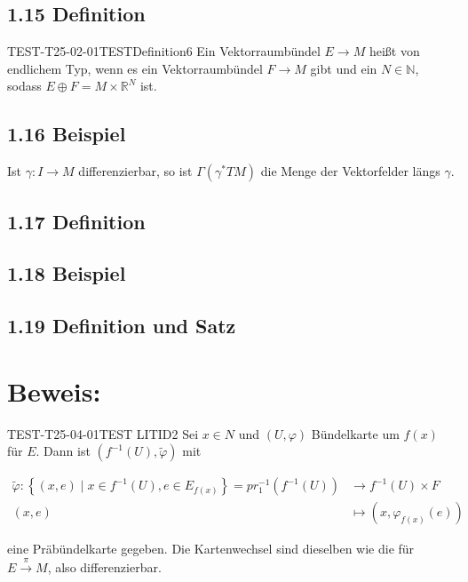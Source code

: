 \subsection*{1.15 Definition}
\begin{EXA}{TEST-T25-02-01}{TESTDefinition6}
Ein Vektorraumbündel $E \rightarrow M$ heißt von endlichem Typ, wenn es ein Vektorraumbündel $F \rightarrow M$ gibt und ein $N \in \mathbb{N}$, sodass $E \oplus F=M \times \mathbb{R}^{N}$ ist.
\end{EXA}

\subsection*{1.16 Beispiel}
Ist $\gamma: I \rightarrow M$ differenzierbar, so ist $\Gamma\left(\gamma^{*} T M\right)$ die Menge der Vektorfelder längs $\gamma$.

\subsection*{1.17 Definition}

\subsection*{1.18 Beispiel}

\subsection*{1.19 Definition und Satz}

\section*{Beweis:}
\begin{EXA}{TEST-T25-04-01}{TEST LITID2}
Sei $x \in N$ und $(U, \varphi)$ Bündelkarte um $f(x)$ für $E$. Dann ist $\left(f^{-1}(U), \tilde{\varphi}\right)$ mit

$$
\begin{aligned}
\tilde{\varphi}:\left\{(x, e) \mid x \in f^{-1}(U), e \in E_{f(x)}\right\}=p r_{1}^{-1}\left(f^{-1}(U)\right) & \longrightarrow f^{-1}(U) \times F \\
(x, e) & \mapsto\left(x, \varphi_{f(x)}(e)\right)
\end{aligned}
$$

eine Präbündelkarte gegeben. Die Kartenwechsel sind dieselben wie die für $E \xrightarrow{\pi} M$, also differenzierbar.
\end{EXA}

